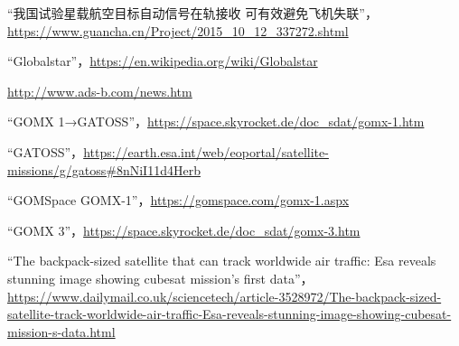 \begin{thebibliography}{99}
“我国试验星载航空目标自动信号在轨接收 可有效避免飞机失联”，\url{https://www.guancha.cn/Project/2015_10_12_337272.shtml}

“Globalstar”，\url{https://en.wikipedia.org/wiki/Globalstar}

\url{http://www.ads-b.com/news.htm}

“GOMX 1→GATOSS”，\url{https://space.skyrocket.de/doc_sdat/gomx-1.htm}

“GATOSS”，\url{https://earth.esa.int/web/eoportal/satellite-missions/g/gatoss#8nNiI11d4Herb}

“GOMSpace GOMX-1”，\url{https://gomspace.com/gomx-1.aspx}

“GOMX 3”，\url{https://space.skyrocket.de/doc_sdat/gomx-3.htm}

“The backpack-sized satellite that can track worldwide air traffic: Esa reveals stunning image showing cubesat mission's first data”，\url{https://www.dailymail.co.uk/sciencetech/article-3528972/The-backpack-sized-satellite-track-worldwide-air-traffic-Esa-reveals-stunning-image-showing-cubesat-mission-s-data.html}

\end{thebibliography}